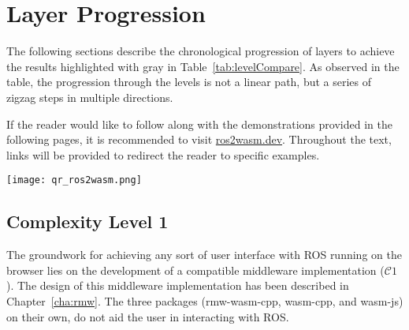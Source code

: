 \section{Layer Progression}

    The following sections describe the chronological progression of layers to achieve the results highlighted with gray in Table~\ref{tab:levelCompare}. As observed in the table, the progression through the levels is not a linear path, but a series of zigzag steps in multiple directions.

    \vspace{1em}
    \begin{tcolorbox}[title=Note]
        \begin{minipage}[t]{0.87\linewidth}
            \vspace*{0pt}
            If the reader would like to follow along with the demonstrations
            provided in the following pages, it is recommended to visit 
            \href{https://ros2wasm.dev/}{\textsf{ros2wasm.dev}}.
            Throughout the text, links will be provided to redirect the reader 
            to specific examples.
        \end{minipage}\hfill%
        \begin{minipage}[t]{0.1\linewidth}
            \vspace*{0pt}
            \texttt{[image: qr\_ros2wasm.png]}
        \end{minipage}
    \end{tcolorbox}


        \subsection{Complexity Level 1}

        The groundwork for achieving any sort of user interface with \ac{ROS} running on the browser lies on the development of a compatible middleware implementation ($\mathcal{C}1$). The design of this middleware implementation has been described in Chapter~\ref{cha:rmw}. The three packages (\textsf{rmw-wasm-cpp}, \textsf{wasm-cpp}, and \textsf{wasm-js}) on their own, do not aid the user in interacting with \ac{ROS}.

